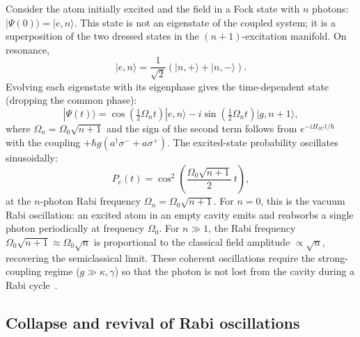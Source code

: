 \documentclass[12pt]{iopart}
\begin{document}
Consider the atom initially excited and the field in a Fock state with $n$ photons: $|\Psi(0)\rangle = |e, n\rangle$. This state is not an eigenstate of the coupled system; it is a superposition of the two dressed states in the $(n{+}1)$-excitation manifold. On resonance,
\begin{equation}
|e, n\rangle = \frac{1}{\sqrt{2}}\left(|n,+\rangle + |n,-\rangle\right).
\end{equation}
Evolving each eigenstate with its eigenphase gives the time-dependent state (dropping the common phase):
\begin{equation}
|\Psi(t)\rangle = \cos\!\left(\tfrac{1}{2}\Omega_n t\right)|e,n\rangle - i\sin\!\left(\tfrac{1}{2}\Omega_n t\right)|g,n{+}1\rangle,
\label{eq:rabi_evolution}
\end{equation}
where $\Omega_n = \Omega_0\sqrt{n+1}$ and the sign of the second term follows from $e^{-iH_{\text{JC}}t/\hbar}$ with the coupling $+\hbar g(a^\dagger\sigma^- + a\sigma^+)$. The excited-state probability oscillates sinusoidally:
\begin{equation}
P_e(t) = \cos^2\!\left(\frac{\Omega_0\sqrt{n+1}}{2}\,t\right),
\label{eq:pe_fock}
\end{equation}
at the $n$-photon Rabi frequency $\Omega_n = \Omega_0\sqrt{n+1}$. For $n = 0$, this is the vacuum Rabi oscillation: an excited atom in an empty cavity emits and reabsorbs a single photon periodically at frequency $\Omega_0$. For $n \gg 1$, the Rabi frequency $\Omega_0\sqrt{n+1} \approx \Omega_0\sqrt{n}$ is proportional to the classical field amplitude $\propto \sqrt{n}$, recovering the semiclassical limit. These coherent oscillations require the strong-coupling regime ($g \gg \kappa, \gamma$) so that the photon is not lost from the cavity during a Rabi cycle~\cite{haroche2006}.


\subsection{Collapse and revival of Rabi oscillations}
\label{sec:collapse_revival}
\end{document}
